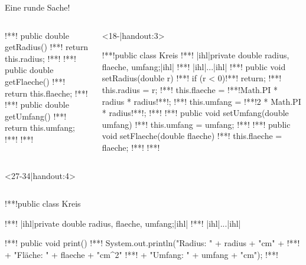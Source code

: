 \begin{frame}[c,fragile]{Eine runde Sache!}
\begin{onlyenv}
\begin{columns}[c,onlytextwidth]
\begin{onlyenv}
\begin{plainjava}
{!**!   public double getRadius() {
!**!       return this.radius;
!**!   }
!**!   public double getFlaeche() {
!**!       return this.flaeche;
!**!   }
!**!   public double getUmfang() {
!**!       return this.umfang;
!**!   }
!**!}
\end{plainjava}
\end{onlyenv}
\begin{onlyenv}<18-|handout:3>
\begin{plainjava}
!**!public class Kreis {
!**!   |ihl|private double radius, flaeche, umfang;|ihl|
!**!   |ihl|...|ihl|
!**!   public void setRadius(double r) {
!**!       if (r < 0)!**! return;
!**!       this.radius = r;
!**!       this.flaeche = !**!Math.PI * radius * radius!**!;
!**!       this.umfang = !**!2 * Math.PI * radius!**!;
!**!   }
!**!   public void setUmfang(double umfang) {
!**!       this.umfang = umfang;
!**!   }
!**!   public void setFlaeche(double flaeche) {
!**!       this.flaeche = flaeche;
!**!   }
!**!}
\end{plainjava}
\end{onlyenv}
\end{columns}
\end{onlyenv}
\begin{onlyenv}<27-34|handout:4>
\begin{columns}[c,onlytextwidth]
\footnotesize{}\medskip\par
{}
\SetupLstHl
\begin{plainjava}
!**!public class Kreis {
!**!   |ihl|private double radius, flaeche, umfang;|ihl|
!**!   |ihl|...|ihl|

!**!   public void print() {
!**!      System.out.println("Radius: " + radius + "cm" +
!**!           + "\n Fläche: " + flaeche + "cm^2"
!**!           + "\n Umfang: " + umfang + "cm");
!**!   }

}
\end{plainjava}
\end{columns}
\end{onlyenv}
\end{frame}
